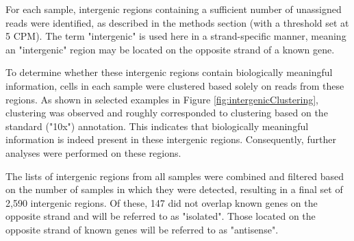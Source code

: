 For each sample, intergenic regions containing a sufficient number of unassigned reads were identified,
as described in the methods section (with a threshold set at 5 CPM).
The term "intergenic" is used here in a strand-specific manner,
meaning an "intergenic" region may be located on the opposite strand of a known gene.

To determine whether these intergenic regions contain biologically meaningful information,
cells in each sample were clustered based solely on reads from these regions.
As shown in selected examples in Figure \ref{fig:intergenicClustering},
clustering was observed and roughly corresponded to clustering based on the standard ("10x") annotation.
This indicates that biologically meaningful information is indeed present in these intergenic regions.
Consequently, further analyses were performed on these regions.

The lists of intergenic regions from all samples were combined and filtered based on the number of samples in which they were detected,
resulting in a final set of 2,590 intergenic regions.
Of these, 147 did not overlap known genes on the opposite strand and will be referred to as "isolated".
Those located on the opposite strand of known genes will be referred to as "antisense".

